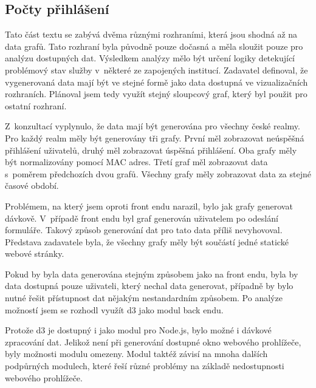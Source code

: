 \documentclass[thesis=M,czech]{FITthesis}[2012/06/26]
\begin{document}
    \subsection{Počty přihlášení}

      Tato část textu se zabývá dvěma různými rozhraními, která jsou
      shodná až na data grafů.
      Tato rozhraní byla původně pouze dočasná a měla sloužit pouze pro analýzu dostupných dat.
      Výsledkem analýzy mělo být určení logiky detekující problémový stav služby
      v~některé ze zapojených institucí.
      Zadavatel definoval, že vygenerovaná data mají být ve stejné formě jako 
      data dostupná ve vizualizačních rozhraních.
      Plánoval jsem tedy využít stejný sloupcový graf, který byl použit pro ostatní rozhraní.

      Z~konzultací vyplynulo, že data mají být generována
      pro všechny české realmy.
      Pro každý realm měly být generovány tři grafy.
      První měl zobrazovat neúspěšná přihlášení
      uživatelů, druhý měl zobrazovat úspěšná přihlášení.
      Oba grafy měly být normalizovány pomocí MAC adres.
      Třetí graf měl zobrazovat data s~poměrem předchozích dvou grafů.
      Všechny grafy měly zobrazovat data za stejné časové období.

      Problémem, na který jsem oproti front endu narazil,
      bylo jak grafy generovat dávkově.
      V~případě front endu byl graf generován uživatelem po odeslání formuláře.
      Takový způsob generování dat pro tato data příliš nevyhovoval.
      Představa zadavatele byla, že všechny grafy měly být součástí
      jedné statické webové stránky.

      Pokud by byla data generována stejným způsobem jako na front endu,
      byla by data dostupná pouze uživateli, který nechal data generovat,
      případně by bylo nutné řešit přístupnost dat nějakým nestandardním způsobem.
      Po analýze možností jsem se rozhodl využít d3 jako modul back endu.

      Protože d3 je dostupný i jako modul pro Node.js,
      bylo možné i dávkové zpracování dat.
      Jelikož není při generování dostupné okno webového prohlížeče,
      byly možnosti modulu omezeny.
      Modul taktéž závisí na mnoha dalších podpůrných modulech,
      které řeší různé problémy na základě nedostupnosti webového prohlížeče.

\end{document}
